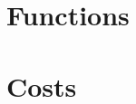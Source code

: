 \documentclass{article}
\begin{document}
\tableofcontents

\clearpage

\section{Functions}


\section{Costs}

\end{document}
